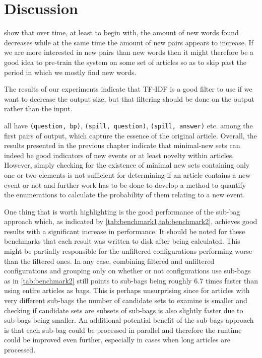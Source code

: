 \chapter{Discussion}
\label{chapter:discussion}

 show that over time, at least to begin with, the amount of new words found decreases while at the same time the amount of new pairs appears to increase. If we are more interested in new pairs than new words then it might therefore be a good idea to pre-train the system on some set of articles so as to skip past the period in which we mostly find new words.

The results of our experiments indicate that TF-IDF is a good filter to use if we want to decrease the output size, but that filtering should be done on the output rather than the input.

 all have \lstinline{(question, bp)}, \lstinline{(spill, question)}, \lstinline{(spill, answer)} etc. among the first pairs of output, which capture the essence of the original article. Overall, the results presented in the previous chapter indicate that minimal-new sets can indeed be good indicators of new events or at least novelty within articles. However, simply checking for the existence of minimal new sets containing only one or two elements is not sufficient for determining if an article contains a new event or not and further work has to be done to develop a method to quantify the enumerations to calculate the probability of them relating to a new event.

One thing that is worth highlighting is the good performance of the sub-bag approach which, as indicated by \cref{tab:benchmark1,tab:benchmark2}, achieves good results with a significant increase in performance. It should be noted for these benchmarks that each result was written to disk after being calculated. This might be partially responsible for the unfiltered configurations performing worse than the filtered ones. In any case, combining filtered and unfiltered configurations and grouping only on whether or not configurations use sub-bags as in \cref{tab:benchmark2} still points to sub-bags being roughly 6.7 times faster than using entire articles as bags. This is perhaps unsurprising since for articles with very different sub-bags the number of candidate sets to examine is smaller and checking if candidate sets are subsets of sub-bags is also slightly faster due to sub-bags being smaller. An additional potential benefit of the sub-bags approach is that each sub-bag could be processed in parallel and therefore the runtime could be improved even further, especially in cases when long articles are processed.


